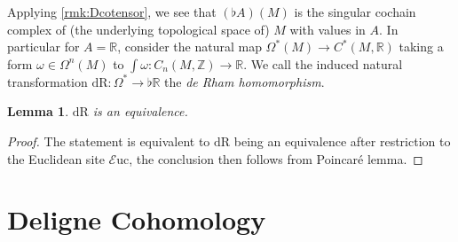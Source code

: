 \documentclass[10pt]{amsart}
\newcommand{\bE}{\mathbb{E}}
\newcommand{\bR}{\mathbb{R}}
\newcommand{\bZ}{\mathbb{Z}}
\newcommand{\Euc}{\mathscr{E}\mathrm{uc}}
\newcommand{\dr}{\mathrm{dR}}
\newtheorem{lemma}[equation]{Lemma}
\theoremstyle{definition}
\theoremstyle{remark}
\numberwithin{equation}{section}
\begin{document}
Applying \cref{rmk:Dcotensor}, we see that $(\flat A)(M)$ is the singular cochain complex of (the underlying topological space of) $M$ with values in $A$. In particular for $A=\bR$, consider the natural map $\Omega^*(M)\to C^*(M,\bR)$ taking a form $\omega\in\Omega^n(M)$ to $\int\omega:C_{n}(M,\bZ)\to\bR$. We call the induced natural transformation $\dr:\Omega^*\to\flat\bR$ the \emph{de Rham homomorphism}.
\begin{lemma}\label{lem:derham} $\dr$ is an equivalence.
\end{lemma}
\begin{proof}
  The statement is equivalent to $\dr$ being an equivalence after restriction to the Euclidean site $\Euc$, the conclusion then follows from Poincar\'e lemma. 
\end{proof}


\section{Deligne Cohomology}
\end{document}
